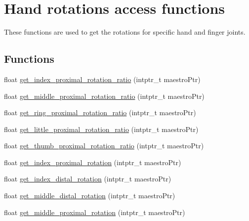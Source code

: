 \hypertarget{group__rotation_access}{}\section{Hand rotations access functions}
\label{group__rotation_access}


These functions are used to get the rotations for specific hand and finger joints.  


\subsection*{Functions}
\begin{DoxyCompactItemize}
\item 
float \hyperlink{group__rotation_access_ga2b6d18c3684d7f0759ebae5201edc666}{get\+\_\+index\+\_\+proximal\+\_\+rotation\+\_\+ratio} (intptr\+\_\+t maestro\+Ptr)
\item 
float \hyperlink{group__rotation_access_gaf8bed7222cb6414313c279237f4233d7}{get\+\_\+middle\+\_\+proximal\+\_\+rotation\+\_\+ratio} (intptr\+\_\+t maestro\+Ptr)
\item 
float \hyperlink{group__rotation_access_gaf6dfb65e74ed572e79a082d42e53157f}{get\+\_\+ring\+\_\+proximal\+\_\+rotation\+\_\+ratio} (intptr\+\_\+t maestro\+Ptr)
\item 
float \hyperlink{group__rotation_access_gad356c1f99c4dbb4631a28f0cf8e654b5}{get\+\_\+little\+\_\+proximal\+\_\+rotation\+\_\+ratio} (intptr\+\_\+t maestro\+Ptr)
\item 
float \hyperlink{group__rotation_access_ga6757e84fae5850e95bf380b534a1dd14}{get\+\_\+thumb\+\_\+proximal\+\_\+rotation\+\_\+ratio} (intptr\+\_\+t maestro\+Ptr)
\item 
float \hyperlink{group__rotation_access_ga7d2da9a343911275b4343c2904c0f92a}{get\+\_\+index\+\_\+proximal\+\_\+rotation} (intptr\+\_\+t maestro\+Ptr)
\item 
float \hyperlink{group__rotation_access_ga00e2691df05ed045e6f2ec02082d941c}{get\+\_\+index\+\_\+distal\+\_\+rotation} (intptr\+\_\+t maestro\+Ptr)
\item 
float \hyperlink{group__rotation_access_gaddec3e0d8d07788424fc1d9b202472c4}{get\+\_\+middle\+\_\+distal\+\_\+rotation} (intptr\+\_\+t maestro\+Ptr)
\item 
float \hyperlink{group__rotation_access_gab9cbb79e5f1b47bd20c079d636b825f0}{get\+\_\+middle\+\_\+proximal\+\_\+rotation} (intptr\+\_\+t maestro\+Ptr)
\item 

\end{DoxyCompactItemize}
